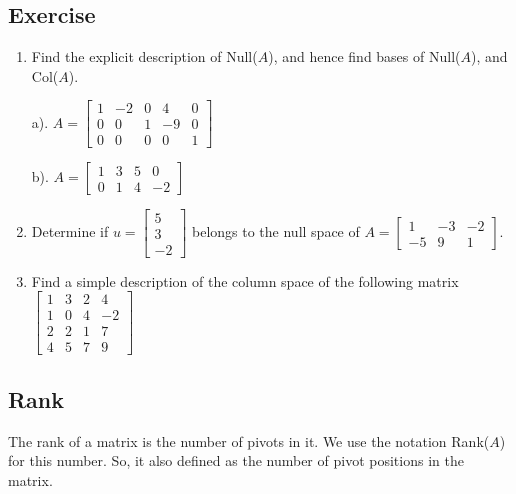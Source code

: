\documentclass[aima104_lecturenotes_ku.tex]{subfiles}
\begin{document}
\subsection{Exercise}
\begin{enumerate}
\item Find the explicit description of Null($A$), and hence find bases of Null($A$), and Col($A$).
  \begin{multicols}{2}
    a). $A=
    \begin{bmatrix}
      1 & -2 & 0 & 4 & 0 \\
      0 & 0 & 1 & -9 & 0 \\
      0 & 0 & 0 & 0 & 1
    \end{bmatrix}
    $

    \columnbreak
b). $A =
\begin{bmatrix}
  1 & 3 & 5 & 0 \\
  0 & 1 & 4 & -2
\end{bmatrix}
$
\end{multicols}

\item Determine if $u=
  \begin{bmatrix}
    5 \\ 3 \\ -2
  \end{bmatrix}
  $ belongs to the null space of $A=
  \begin{bmatrix}
    1 & -3 & -2 \\
    -5 & 9 & 1
  \end{bmatrix}
  $.

\item Find a simple description of the column space of the following matrix $\begin{bmatrix}
    1 & 3 & 2 & 4 \\
    1 & 0 & 4 & -2 \\
    2 & 2 & 1 & 7 \\
    4 & 5 & 7 & 9
\end{bmatrix}$

\end{enumerate}
\subsection{Rank}
\begin{definition}
The rank of a matrix is the number of pivots in it. We use the notation Rank($A$) for this number. So, it also defined as the number of pivot positions in the matrix.
\end{definition}
\end{document}
